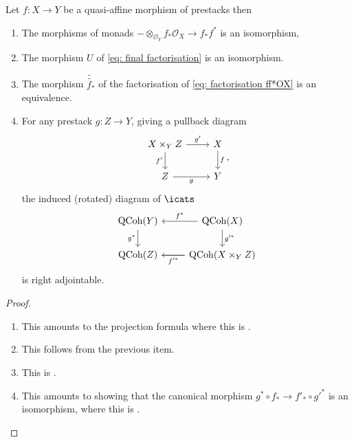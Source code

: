 \documentclass[10pt,reqno]{amsart}
\numberwithin{equation}{section}
\newcommand{\cO}{{\mathcal{O}}}
\newcommand{\Qcoh}{\mathrm{QCoh}}
\begin{document}
\begin{proposition}\label{prop: GR facts we need}
    Let $f\colon X\to Y$ be a quasi-affine morphism of prestacks then 
\begin{enumerate}
    \item The morphisms of monads $-\otimes_{\cO_Y}f_*\cO_X\to f_*f^*$ is an isomorphism,
    \item The morphism $U$ of \ref{eq: final factorisation} is an isomorphism.
    \item The morphism $\tilde{\tilde{f_*}}$ of the factorisation of \ref{eq: factorisation ff*OX} is an equivalence.
    \item For any prestack $g:Z\to Y$, giving a pullback diagram $$%
\begin{tikzcd}
X\times_Y Z \arrow[d, "f'"'] \arrow[r, "g'"] & X \arrow[d, "f"] \\
Z \arrow[r, "g"']                            & Y               
\end{tikzcd},$$ the induced (rotated) diagram of $\icats$ 
$$%
\begin{tikzcd}
\Qcoh(Y) \arrow[d, "g^*"']  & \Qcoh(X) \arrow[l, "f^*"'] \arrow[d, "g'^*"] \\
\Qcoh(Z) \arrow[r, no head] & \Qcoh(X\times_Y Z) \arrow[l, "f'^*"]        
\end{tikzcd}$$ is right adjointable. 
\end{enumerate}
\end{proposition}

\begin{proof}
    \begin{enumerate}
        \item This amounts to the projection formula where this is \cite[Lemma 3.2.4]{GaitsgoryRozenblyum2017SAGI}.
        \item This follows from the previous item.
        \item This is \cite[Proposition 3.3.3]{GaitsgoryRozenblyum2017SAGI}.
        \item This amounts to showing that the canonical morphism $g^*\circ f_*\to f'_*\circ g'^*$ is an isomorphism, where this is  \cite[Proposition 2.2.2.]{GaitsgoryRozenblyum2017SAGI}.
    \end{enumerate}
\end{proof}
\end{document}

